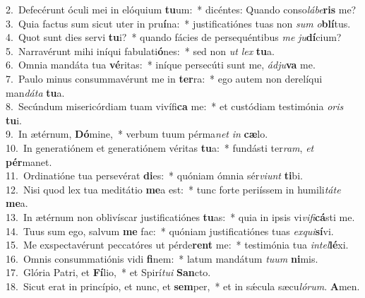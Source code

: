 {2.~}Defecérunt óculi mei in elóquium \textbf{tu}um:~* dicéntes: Quando conso\textit{lá}\textit{be}\textbf{ris} me?\\
{3.~}Quia factus sum sicut uter in pru\textbf{í}na:~* justificatiónes tuas non \textit{sum} \textit{o}\textbf{blí}tus.\\
{4.~}Quot sunt dies servi \textbf{tu}i?~* quando fácies de persequéntibus \textit{me} \textit{ju}\textbf{dí}cium?\\
{5.~}Narravérunt mihi iníqui fabulati\textbf{ó}nes:~* sed non \textit{ut} \textit{lex} \textbf{tu}a.\\
{6.~}Omnia mandáta tua \textbf{vé}ritas:~* iníque persecúti sunt me, \textit{ád}\textit{ju}\textbf{va} me.\\
{7.~}Paulo minus consummavérunt me in \textbf{ter}ra:~* ego autem non derelíqui man\textit{dá}\textit{ta} \textbf{tu}a.\\
{8.~}Secúndum misericórdiam tuam vivífi\textbf{ca} me:~* et custódiam testimónia \textit{o}\textit{ris} \textbf{tu}i.\\
{9.~}In ætérnum, \textbf{Dó}mine,~* verbum tuum pérma\textit{net} \textit{in} \textbf{cæ}lo.\\
{10.~}In generatiónem et generatiónem véritas \textbf{tu}a:~* fundásti ter\textit{ram}, \textit{et} \textbf{pér}manet.\\
{11.~}Ordinatióne tua persevérat \textbf{di}es:~* quóniam ómnia sér\textit{vi}\textit{unt} \textbf{ti}bi.\\
{12.~}Nisi quod lex tua meditátio \textbf{me}a est:~* tunc forte periíssem in humili\textit{tá}\textit{te} \textbf{me}a.\\
{13.~}In ætérnum non oblivíscar justificatiónes \textbf{tu}as:~* quia in ipsis vi\textit{vi}\textit{fi}\textbf{cá}sti me.\\
{14.~}Tuus sum ego, salvum \textbf{me} fac:~* quóniam justificatiónes tuas \textit{ex}\textit{qui}\textbf{sí}vi.\\
{15.~}Me exspectavérunt peccatóres ut pérde\textbf{rent} me:~* testimónia tua \textit{in}\textit{tel}\textbf{lé}xi.\\
{16.~}Omnis consummatiónis vidi \textbf{fi}nem:~* latum mandátum \textit{tu}\textit{um} \textbf{ni}mis.\\
{17.~}Glória Patri, et \textbf{Fí}lio,~* et Spirí\textit{tu}\textit{i} \textbf{San}cto.\\
{18.~}Sicut erat in princípio, et nunc, et \textbf{sem}per,~* et in sǽcula sæcu\textit{ló}\textit{rum}. \textbf{A}men.\\
